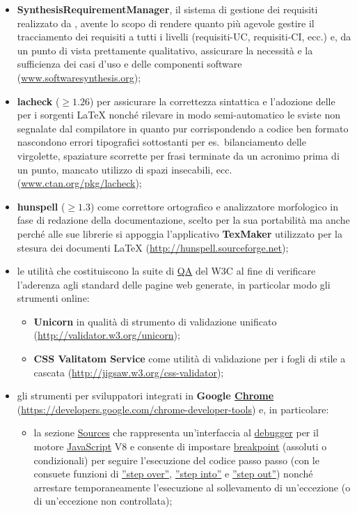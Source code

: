 \begin{itemize}
  \item \textbf{SynthesisRequirementManager}, il sistema di gestione dei requisiti realizzato da \team, avente lo scopo di rendere quanto più agevole gestire il tracciamento dei requisiti a tutti i livelli (requisiti-UC, requisiti-CI, ecc.) e, da un punto di vista prettamente qualitativo, assicurare la necessità e la sufficienza dei casi d'uso e delle componenti software (\url{www.softwaresynthesis.org});
 \item \textbf{lacheck} ($\geq 1.26$) per assicurare la correttezza sintattica e l'adozione delle  per i sorgenti \LaTeX{} nonché rilevare in modo semi-automatico le sviste non segnalate dal compilatore in quanto pur corrispondendo a codice ben formato nascondono errori tipografici sottostanti per es.~bilanciamento delle virgolette, spaziature scorrette per frasi terminate da un acronimo prima di un punto, mancato utilizzo di spazi insecabili, ecc. (\url{www.ctan.org/pkg/lacheck});
 \item \textbf{hunspell} ($\geq 1.3$) come correttore ortografico e analizzatore morfologico in fase di redazione della documentazione, scelto per la sua portabilità ma anche  perché alle sue librerie si appoggia l'applicativo \textbf{TexMaker} utilizzato per la stesura dei documenti \LaTeX{} (\url{http://hunspell.sourceforge.net});
 \item le utilità che costituiscono la suite di \underline{QA} del W3C al fine di verificare l'aderenza agli standard delle pagine web generate, in particolar modo gli strumenti online:
 \begin{itemize}
   \item \textbf{Unicorn} in qualità di strumento di validazione unificato (\url{http://validator.w3.org/unicorn});
   \item \textbf{CSS Valitatom Service} come utilità di validazione per i fogli di stile a cascata (\url{http://jigsaw.w3.org/css-validator});
 \end{itemize}
 \item gli strumenti per sviluppatori integrati in \textbf{Google \underline{Chrome}} (\url{https://developers.google.com/chrome-developer-tools}) e, in particolare:
   \begin{itemize}
   \item la sezione \underline{Sources} che rappresenta un'interfaccia al \underline{debugger} per il motore \underline{JavaScript} V8 e consente di impostare \underline{breakpoint} (assoluti o condizionali) per seguire l'esecuzione del codice passo passo (con le consuete funzioni di \underline{''step over''}, \underline{''step into''} e \underline{''step out''}) nonché arrestare temporaneamente l'esecuzione al sollevamento di un'eccezione (o di un'eccezione non controllata);

\end{itemize}
\end{itemize}
